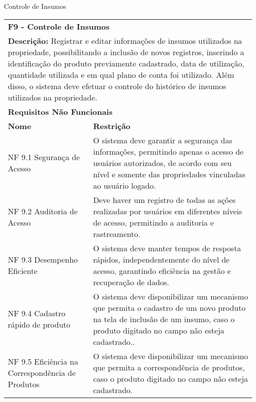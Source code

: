 \begin{tabframed}[htb]
  \caption{Controle de Insumos}
  \label{quad:requisitoControleInsumos}
  \renewcommand{\arraystretch}{1.5}
  \begin{tabular}{|l|l|}
    \cline{1-2}
    \multicolumn{2}{|l|}{\textbf{F9 - Controle de Insumos}}
    \\ \cline{1-2}

    \multicolumn{2}{|p{15cm}|}{
    \raggedright \textbf{Descrição:} Registrar e editar informações de insumos utilizados na propriedade, possibilitando a inclusão de novos registros, inserindo a identificação do produto previamente cadastrado, data de utilização, quantidade utilizada e em qual plano de conta foi utilizado. Além disso, o sistema deve efetuar o controle do histórico de insumos utilizados na propriedade.
    }
    \\ \cline{1-2}

    \multicolumn{2}{|l|}{\textbf{Requisitos Não Funcionais}}
    \\ \cline{1-2}

    \textbf{Nome}                                    &
    \textbf{Restrição}
    \\ \cline{1-2}

    NF 9.1 Segurança de Acesso                       &
    \multicolumn{1}{|p{8cm}|}{\raggedright O sistema deve garantir a segurança das informações, permitindo apenas o acesso de usuários autorizados, de acordo com seu nível e somente das propriedades vinculadas ao usuário logado.}
    \\ \cline{1-2}

    NF 9.2 Auditoria de Acesso                       &
    \multicolumn{1}{|p{8cm}|}{\raggedright Deve haver um registro de todas as ações realizadas por usuários em diferentes níveis de acesso, permitindo a auditoria e rastreamento.}
    \\ \cline{1-2}

    NF 9.3 Desempenho Eficiente                      &
    \multicolumn{1}{|p{8cm}|}{\raggedright O sistema deve manter tempos de resposta rápidos, independentemente do nível de acesso, garantindo eficiência na gestão e recuperação de dados.}
    \\ \cline{1-2}

    NF 9.4 Cadastro rápido de produto                &
    \multicolumn{1}{|p{8cm}|}{\raggedright
    O sistema deve disponibilizar um mecanismo que permita o cadastro de um novo produto na tela de inclusão de um insumo, caso o produto digitado no campo não esteja cadastrado..}
    \\ \cline{1-2}

    NF 9.5 Eficiência na Correspondência de Produtos &
    \multicolumn{1}{|p{8cm}|}{\raggedright
    O sistema deve disponibilizar um mecanismo que permita a correspondência de produtos, caso o produto digitado no campo não esteja cadastrado.}
    \\ \cline{1-2}
  \end{tabular}
  \fonte{} %
\end{tabframed}

